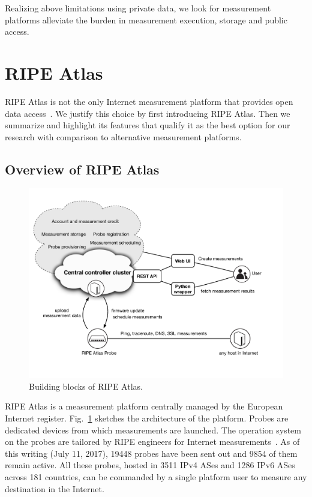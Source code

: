 Realizing above limitations using private data, we look for measurement platforms alleviate the burden in measurement execution, storage and public access.

\section{RIPE Atlas}
RIPE Atlas is not the only Internet measurement platform that provides open data access~\cite{Bajpai2015}.
We justify this choice by first introducing RIPE Atlas. Then we summarize and highlight its features that qualify it as the best option for our research with comparison to alternative measurement platforms.

\subsection{Overview of RIPE Atlas}
\begin{figure}[!htb]
\centering
\includegraphics[width=\textwidth]{gfx/chap3/ripe_atlas_archi.pdf}
\caption{Building blocks of RIPE Atlas.}
\label{fig:ripe_atlas_archi}
\end{figure}

\acf{RIPE} Atlas is a measurement platform centrally managed by the European Internet register.
Fig.~\ref{fig:ripe_atlas_archi} sketches the architecture of the platform.
Probes are dedicated devices from which measurements are launched.
The operation system on the probes are tailored by RIPE engineers for Internet measurements~\cite{firmware}.
As of this writing (July 11, 2017), 19448 probes have been sent out and 9854 of them remain active.
All these probes, hosted in 3511 IPv4 ASes and 1286 IPv6 ASes across 181 countries, can be commanded by a single platform user to measure any destination in the Internet.

